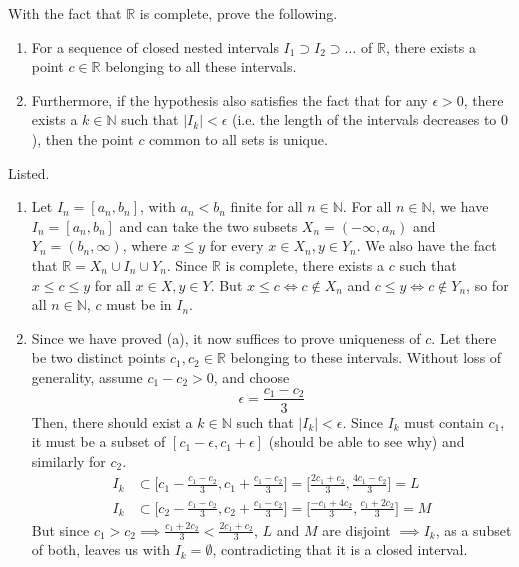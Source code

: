   \begin{exercise}
    With the fact that $\mathbb{R}$ is complete, prove the following. 
    \begin{enumerate}
      \item For a sequence of closed nested intervals $I_1 \supset I_2 \supset \ldots$ of $\mathbb{R}$, there exists a point $c \in \mathbb{R}$ belonging to all these intervals. 
      \item Furthermore, if the hypothesis also satisfies the fact that for any $\epsilon > 0$, there exists a $k \in \mathbb{N}$ such that $|I_k| < \epsilon$ (i.e. the length of the intervals decreases to $0$), then the point $c$ common to all sets is unique. 
    \end{enumerate}
  \end{exercise}
  \begin{solution}
    Listed. 
    \begin{enumerate}
      \item Let $I_n = [a_n, b_n]$, with $a_n < b_n$ finite for all $n \in \mathbb{N}$. For all $n\in \mathbb{N}$, we have $I_n = [a_n, b_n]$ and can take the two subsets $X_n = (-\infty, a_n)$ and $Y_n = (b_n, \infty)$, where $x \leq y$ for every $x \in X_n, y \in Y_n$. We also have the fact that $\mathbb{R} = X_n \cup I_n \cup Y_n$. Since $\mathbb{R}$ is complete, there exists a $c$ such that $x \leq c \leq y$ for all $x \in X, y \in Y$. But $x \leq c \iff c \not\in X_n$ and $c \leq y \iff c \not\in Y_n$, so for all $n \in \mathbb{N}$, $c$ must be in $I_n$. 
      
      \item Since we have proved (a), it now suffices to prove uniqueness of $c$. Let there be two distinct points $c_1, c_2 \in \mathbb{R}$ belonging to these intervals. Without loss of generality, assume $c_1 - c_2 > 0$, and choose 
      \begin{equation}
        \epsilon = \frac{c_1 - c_2}{3}
      \end{equation}
      Then, there should exist a $k \in \mathbb{N}$ such that $|I_k| < \epsilon$. Since $I_k$ must contain $c_1$, it must be a subset of $[c_1 - \epsilon, c_1 + \epsilon]$ (should be able to see why) and similarly for $c_2$. 
      \begin{align*}
        I_k & \subset \bigg[ c_1 - \frac{c_1 - c_2}{3}, c_1 + \frac{c_1 - c_2}{3} \bigg] = \bigg[ \frac{2c_1 + c_2}{3}, \frac{4c_1 - c_2}{3} \bigg] = L\\
        I_k & \subset \bigg[ c_2 - \frac{c_1 - c_2}{3}, c_2 + \frac{c_1 - c_2}{3} \bigg] = \bigg[ \frac{-c_1 + 4 c_2}{3}, \frac{c_1 + 2c_2}{3} \bigg] = M
      \end{align*}
      But since $c_1 > c_2 \implies \frac{c_1 + 2c_2}{3} < \frac{2c_1 + c_2}{3}$, $L$ and $M$ are disjoint $\implies I_k$, as a subset of both, leaves us with $I_k = \emptyset$, contradicting that it is a closed interval. 
    \end{enumerate}
  \end{solution}

